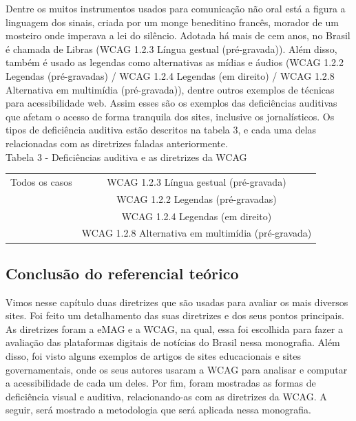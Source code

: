 \documentclass[a4paper]{article}
\begin{document}
\begin{titlepage}
Dentre os muitos instrumentos usados para comunicação não oral está a figura a linguagem dos sinais, criada por um monge beneditino francês, morador de um mosteiro onde imperava a lei do silêncio. Adotada há mais de cem anos, no Brasil é chamada de Libras (WCAG 1.2.3 Língua gestual (pré-gravada)). Além disso, também é usado as legendas como alternativas as mídias e áudios (WCAG 1.2.2 Legendas (pré-gravadas) / WCAG 1.2.4 Legendas (em direito) / WCAG 1.2.8 Alternativa em multimídia (pré-gravada)), dentre outros exemplos de técnicas para acessibilidade web. Assim esses são os exemplos das deficiências auditivas que afetam o acesso de forma tranquila dos sites, inclusive os jornalísticos. Os tipos de deficiência auditiva estão descritos na tabela 3, e cada uma delas relacionadas com as diretrizes faladas anteriormente.\\

Tabela 3 - Deficiências auditiva e as diretrizes da WCAG\\[-1cm]
\begin{center}
	\begin{longtable}{|c|c|}
		\hline
		Todos os casos & WCAG 1.2.3 Língua gestual (pré-gravada)\\
		& WCAG 1.2.2 Legendas (pré-gravadas)\\ 
		& WCAG 1.2.4 Legendas (em direito)\\
		& WCAG 1.2.8 Alternativa em multimídia (pré-gravada)\\
		\hline
	\end{longtable}
\end{center}

\subsection{Conclusão do referencial teórico}

Vimos nesse capítulo duas diretrizes que são usadas para avaliar os mais diversos sites. Foi feito um detalhamento das suas diretrizes e dos seus pontos principais. As diretrizes foram a eMAG e a WCAG, na qual, essa foi escolhida para fazer a avaliação das plataformas digitais de notícias do Brasil nessa monografia. Além disso, foi visto alguns exemplos de artigos de sites educacionais e sites governamentais, onde os seus autores usaram a WCAG para analisar e computar a acessibilidade de cada um deles. Por fim, foram mostradas as formas de deficiência visual e auditiva, relacionando-as com as diretrizes da WCAG. A seguir, será mostrado a metodologia que será aplicada nessa monografia. \\[11cm]


\end{titlepage}
\end{document}
